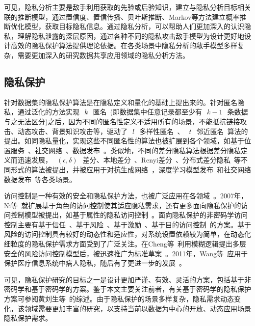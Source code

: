可见，隐私分析主要是敌手利用获取的先验或后验知识，建立与隐私分析目标相关联的推断模型，通过置信度、置信传播、贝叶斯推断、Markov等方法建立概率推断优化模型，获取目标隐私信息。通过隐私分析，可以帮助人们更加深入的认识隐私，理解隐私泄露的深层原因，通过各种不同的隐私攻击敌手模型为设计更好地设计高效的隐私保护算法提供理论依据。在各类场景中隐私分析的敌手模型多样复杂，需要更加深入的研究数据共享应用领域的隐私分析方法。

\subsection{隐私保护}

针对数据集的隐私保护算法是在隐私定义和量化的基础上提出来的。针对匿名隐私，通过泛化的方法实现~$~k~$~匿名~\cite{sweeney2002k}(即数据集中任意记录都至少有~$~k-1~$~条数据与之无法区分)之后，因为不同的匿名性定义不适用所有的场景，不能抵抗链接攻击、动态攻击、背景知识攻击等，驱动了~$~l~$~多样性匿名~\cite{machanavajjhala2007l}、~$~t~$~邻近匿名~\cite{li2007t}算法的提出。如同隐私量化，实现这些不同匿名性的算法也被扩展到各个领域，如基于位置服务~\cite{niu2014achieving}、社交网络~\cite{campan2008data}、数据发布~\cite{wong2006anonymity,ying2009comparisons}。类似地，不同的差分隐私算法根据差分隐私定义而迅速发展，~$~(\epsilon,\delta)~$~差分、本地差分~\cite{kairouz2014extremal}、Renyi差分~\cite{mironov2017renyi}、分布式差分隐私~\cite{cheu2019distributed}等不同形式的算法被提出，并被应用于对抗生成网络~\cite{xu2019ganobfuscator}，深度学习模型发布~\cite{yu2019differentially}和社交网络数据发布~\cite{wang2018real}等各类场景。

访问控制是一种有效的安全和隐私保护方法，也被广泛应用在各领域~\cite{li2017access}。2007年，Ni等~\cite{ni2007privacy}就扩展基于角色的访问控制使其适应隐私需求，还有更多面向隐私保护的访问控制模型被提出，如基于属性的隐私访问控制~\cite{edemacu2019privacy}。面向隐私保护的非密码学访问控制主要有基于信任~\cite{wang2019game}、基于风险~\cite{zhang2018privacy}、基于激励~\cite{liu2011risk}、基于目的访问控制~\cite{amini2019purpose}的方案。基于风险的访问控制具有较好的动态性和适应性，对系统设置依赖较为简单，在动态化细粒度的隐私保护需求方面受到了广泛关注。在Cheng等~\cite{cheng2007fuzzy}利用模糊逻辑提出多层安全的风险访问控制模型后，被迅速推广为标准草案~\cite{mcgraw2009risk}。2011年，Wang等~\cite{wang2011quantified}应用于保护医疗信息系统中病人隐私，随后有了更进一步的发展~\cite{zhang2018privacy,li2017access}。

可见，隐私保护研究的目标之一是设计更加严谨、有效、灵活的方案，包括基于非密码学和基于密码学的方案。鉴于本文主要关注前者，有关基于密码学的隐私保护方案可参阅黄刘生等~\cite{huang2015review}的综述。由于隐私保护的场景多样复杂，隐私需求动态变化，该领域需要更加丰富的研究，以支持当前以数据为中心的开放、动态应用场景隐私保护需求。


